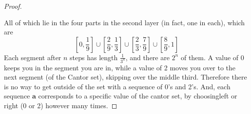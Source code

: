 \documentclass[hidelinks,12pt]{article}
\begin{document}
\begin{enumerate}
\begin{proof}
\begin{itemize}
            \end{itemize}All of which lie in the four parts in the second layer (in fact, one in each), which are
            \[
                \left[0,\frac{1}{9}\right]\cup\left[\frac{2}{9},\frac{1}{3}\right]\cup\left[\frac{2}{3},\frac{7}{9}\right]\cup\left[\frac{8}{9},1\right]
            \]
            Each segment after \(n\) steps has length \(\frac{1}{3^{n}}\), and there are \(2^{n}\) of them. A value of \(0\) keeps you in the segment you are in, while a value of 2 moves you over to the next segment (of the Cantor set), skipping over the middle third. Therefore there is no way to get outside of the set with a sequence of 0's and 2's. And, each sequence \(\mathbf{a}\) corresponds to a specific value of the cantor set, by choosingleft or right (0 or 2) however many times. 
    \end{proof}
\end{enumerate}
\end{document}
